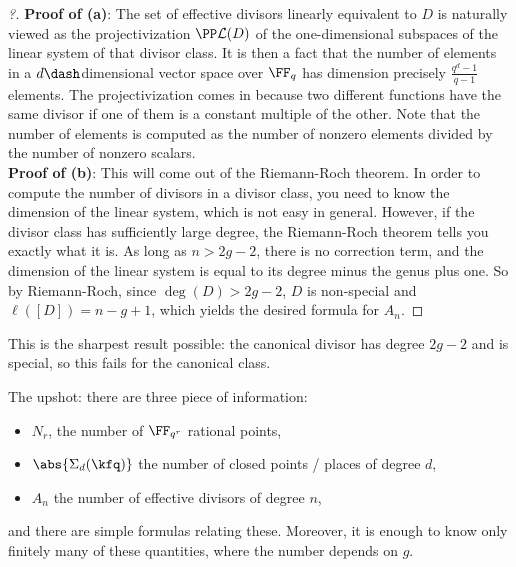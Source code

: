 \begin{proof}[?]

\envlist

\textbf{Proof of (a)}: The set of effective divisors linearly equivalent
to \(D\) is naturally viewed as the projectivization
\(\PP \mathcal{L}(D)\) of the one-dimensional subspaces of the linear
system of that divisor class. It is then a fact that the number of
elements in a \(d\dash\)dimensional vector space over \(\FF_q\) has
dimension precisely \(\frac{q^d-1}{q-1}\) elements. The projectivization
comes in because two different functions have the same divisor if one of
them is a constant multiple of the other. Note that the number of
elements is computed as the number of nonzero elements divided by the
number of nonzero scalars.\\

\textbf{Proof of (b)}: This will come out of the Riemann-Roch theorem.
In order to compute the number of divisors in a divisor class, you need
to know the dimension of the linear system, which is not easy in
general. However, if the divisor class has sufficiently large degree,
the Riemann-Roch theorem tells you exactly what it is. As long as
\(n > 2g-2\), there is no correction term, and the dimension of the
linear system is equal to its degree minus the genus plus one. So by
Riemann-Roch, since \(\deg(D) > 2g-2\), \(D\) is non-special and
\(\ell([D]) = n-g+1\), which yields the desired formula for \(A_n\).

\end{proof}

\begin{remark}

This is the sharpest result possible: the canonical divisor has degree
\(2g-2\) and is special, so this fails for the canonical class.

The upshot: there are three piece of information:

\begin{itemize}
\item
  \(N_r\), the number of \(\FF_{q^r}\) rational points,
\item
  \(\abs{\Sigma_d(\kfq)}\) the number of closed points / places of
  degree \(d\),
\item
  \(A_n\) the number of effective divisors of degree \(n\),
\end{itemize}

and there are simple formulas relating these. Moreover, it is enough to
know only finitely many of these quantities, where the number depends on
\(g\).

\end{remark}

